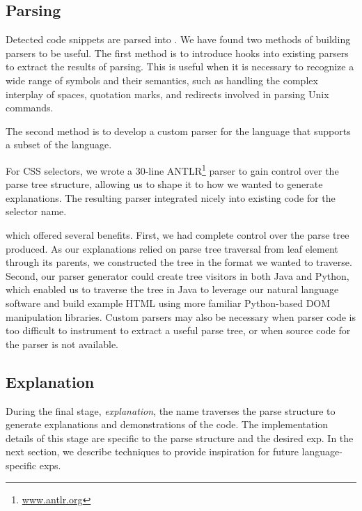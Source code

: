 \subsection{Parsing}
Detected code snippets are parsed into .
We have found two methods of building parsers to be useful. The first method is to introduce hooks into existing parsers to extract the results of parsing.  This is useful 
when it is necessary to recognize a wide range of symbols and their semantics, %
such as handling the complex interplay of spaces, quotation marks, and redirects involved in parsing Unix commands.

The second method is to develop a custom parser for the language that supports a subset of the language.
\begin{changes}
For CSS selectors, we wrote a 30-line ANTLR\footnote{\url{www.antlr.org}} parser to gain control over the parse tree structure, allowing us to shape it to how we wanted to generate explanations.
The resulting parser integrated nicely into existing code for the selector \Gls{name}.
\end{changes}
which offered several benefits.
First, we had complete control over the parse tree produced.
As our explanations relied on parse tree traversal from leaf element through its parents, we constructed the tree in the format we wanted to traverse.
Second, our parser generator could create tree visitors in both Java and Python, which enabled us to traverse the tree in Java to leverage our natural language software and build example HTML using more familiar Python-based DOM manipulation libraries.
Custom parsers may also be necessary when parser code is too difficult to instrument to extract a useful parse tree, or when source code for the parser is not available.
\fi

\subsection{Explanation}

During the final stage, \emph{explanation}, the \Gls{name} traverses the parse structure to generate explanations and demonstrations of the code.
The implementation details of this stage are specific to the parse structure and the desired \gls{exp}.
In the next section, we describe techniques to provide inspiration for future language-specific \glspl{exp}.
